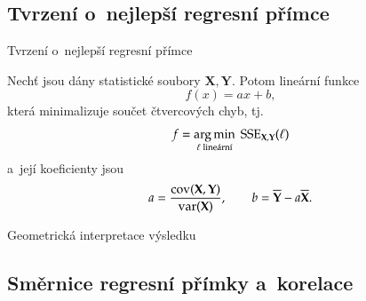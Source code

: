 \documentclass[11pt,professionalfont,aspectratio=43]{beamer}
\begin{document}
\subsection{Tvrzení o~nejlepší regresní přímce}

\begin{frame}{Tvrzení o~nejlepší regresní přímce}
    \begin{propblock}
        Nechť jsou dány statistické soubory $\mathbf{X},\mathbf{Y}$. Potom  lineární funkce
        \[
            f(x)=ax+b,
        \]
        která minimalizuje součet čtvercových chyb, tj. 
        \[
            f=\operatorname*{arg\,min}_{\ell\;\text{lineární}}\;\operatorname{SSE}_{\mathbf{X},\mathbf{Y}}(\ell)
        \]
        a~její koeficienty jsou
        \[
            a=\frac{\operatorname{cov}(\mathbf{X},\mathbf{Y})}{\operatorname{var}(\mathbf{X})},
            \qquad
            b=\overline{\mathbf{Y}}-a\overline{\mathbf{X}}.
        \]
    \end{propblock}
\end{frame}


\begin{frame}{Geometrická interpretace výsledku}


\end{frame}

\subsection{Směrnice regresní přímky a~korelace}
\end{document}
